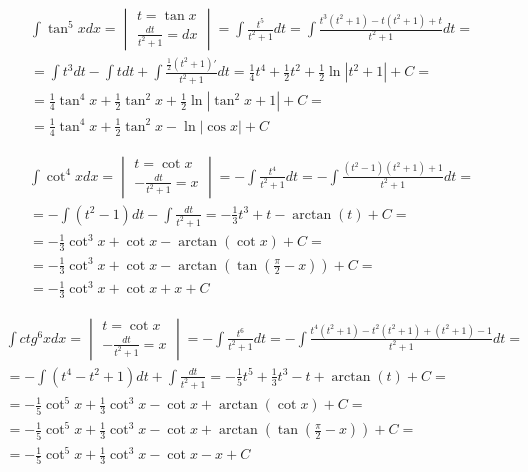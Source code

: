 
\begin{gather*}
  \int \tan^5 x dx =
  \begin{vmatrix}
    t=\tan x \\
    \frac{dt}{t^2+1}=dx
  \end{vmatrix}
  = \int \frac{t^5}{t^2+1}dt
  = \int \frac{t^3(t^2+1)-t(t^2+1)+t}{t^2+1}dt = \\
  = \int t^3dt-\int tdt+\int \frac{\frac{1}{2}(t^2+1)'}{t^2+1}dt
  = \frac{1}{4}t^4+\frac{1}{2}t^2+\frac{1}{2}\ln|t^2+1|+C =  \\
  = \frac{1}{4}\tan^4 x+\frac{1}{2}\tan^2 x+\frac{1}{2}\ln|\tan^2 x+1|+C =  \\
  = \frac{1}{4}\tan^4 x+\frac{1}{2}\tan^2 x-\ln|\cos x|+C
\end{gather*}



\begin{gather*}\int \cot^4 x dx = \begin{vmatrix} t=\cot x \\ -\frac{dt}{t^2+1}=x \end{vmatrix} = -\int \frac{t^4}{t^2+1}dt = -\int \frac{(t^2-1)(t^2+1)+1}{t^2+1}dt =  \\
= -\int (t^2-1)dt - \int \frac{dt}{t^2+1} = -\frac{1}{3}t^3+t-\arctan (t)+C =  \\
= -\frac{1}{3}\cot^3 x+\cot x - \arctan (\cot x)+C =  \\
= -\frac{1}{3}\cot^3 x+\cot x - \arctan (\tan (\frac{\pi}{2}-x))+C =  \\
= -\frac{1}{3}\cot^3 x+\cot x + x +C\end{gather*}



\begin{gather*}\int ctg^6 x dx = \begin{vmatrix} t=\cot x \\ -\frac{dt}{t^2+1}=x \end{vmatrix} = -\int \frac{t^6}{t^2+1}dt = -\int \frac{t^4(t^2+1)-t^2(t^2+1)+(t^2+1)-1}{t^2+1}dt =  \\
= -\int (t^4-t^2+1)dt+\int \frac{dt}{t^2+1} = -\frac{1}{5}t^5+\frac{1}{3}t^3-t+\arctan(t) + C =  \\
= -\frac{1}{5}\cot^5 x+\frac{1}{3}\cot^3 x-\cot x+\arctan(\cot x) + C =  \\
= -\frac{1}{5}\cot^5 x+\frac{1}{3}\cot^3 x-\cot x+\arctan(\tan (\frac{\pi}{2}-x)) + C =  \\
= -\frac{1}{5}\cot^5 x+\frac{1}{3}\cot^3 x-\cot x-x + C\end{gather*}


